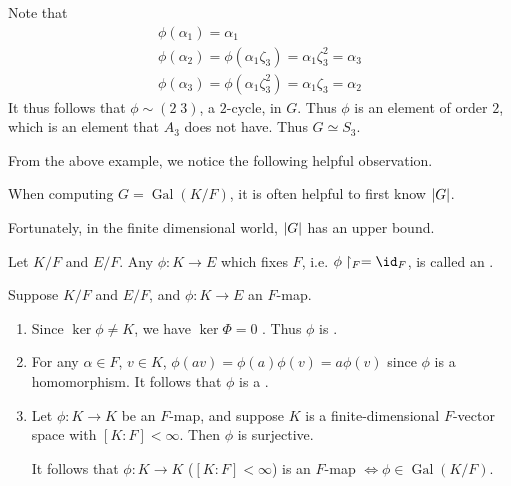 \documentclass[notoc,notitlepage,nobib]{tufte-book}
\DeclareMathOperator{\Gal}{Gal}
\begin{document}
\begin{eg}
   Note that
  \begin{gather*}
    \phi(\alpha_1) = \alpha_1 \\
    \phi(\alpha_2) = \phi(\alpha_1 \zeta_3) = \alpha_1 \zeta_3^2 = \alpha_3 \\
    \phi(\alpha_3) = \phi(\alpha_1 \zeta_3^2) = \alpha_1 \zeta_3 = \alpha_2
  \end{gather*}
  It thus follows that $\phi \sim (2 \; 3)$, a $2$-cycle, in $G$. Thus $\phi$ is
  an element of order $2$, which is an element that $A_3$ does not have. Thus $G
  \simeq S_3$.
\end{eg}

From the above example, we notice the following helpful observation.

\begin{remark}
  When computing $G = \Gal(K / F)$, it is often helpful to first know $\left|G\right|$.
\end{remark}

Fortunately, in the finite dimensional world, $\left|G\right|$ has an upper bound.

\begin{defn}[$F$-map]\label{defn:_f_map}
  Let $K / F$ and $E / F$. Any  $\phi : K \to E$ which
  fixes $F$, i.e. $\phi \restriction_F = \id_F$, is called an
  .
\end{defn}

\begin{remark}
  Suppose $K / F$ and $E / F$, and $\phi : K \to E$ an $F$-map.
  \begin{enumerate}
    \item Since $\ker \phi \neq K$, we have $\ker \Phi = 0$ . Thus $\phi$ is
      .
    \item For any $\alpha \in F$, $v \in K$, $\phi(av) = \phi(a) \phi(v) = a
      \phi(v)$ since $\phi$ is a homomorphism. It follows that $\phi$ is a
      .
    \item Let $\phi : K \to K$ be an $F$-map, and suppose $K$ is a
      finite-dimensional $F$-vector space with $[ K : F ] < \infty$. Then $\phi
      $ is surjective.

      It follows that $\phi : K \to K$ ($[K : F] < \infty$) is an $F$-map $\iff
      \phi \in \Gal(K / F)$.
  \end{enumerate}
\end{remark}
\end{document}
